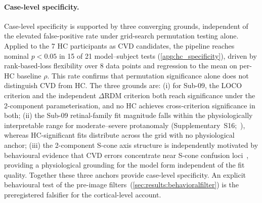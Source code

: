 \paragraph{Case-level specificity.}
Case-level specificity is supported by three converging grounds,
independent of the elevated false-positive rate under grid-search
permutation testing alone. Applied to the 7 HC participants as CVD
candidates, the pipeline reaches nominal $p < 0.05$ in 15 of 21
model--subject tests (\cref{app:hc_specificity}), driven by
rank-based-loss flexibility over 8 data points and regression to the
mean on per-HC baseline $\rho$. This rate confirms that permutation
significance alone does not distinguish CVD from HC. The three grounds
are: (i) for
Sub-09, the LOCO criterion and the independent $\Delta$RDM criterion both
reach significance under the 2-component parameterisation, and no HC
achieves cross-criterion significance in both; (ii) the Sub-09 retinal-family
fit magnitude falls within the physiologically interpretable range for
moderate--severe protanomaly (Supplementary~S16;~),
whereas HC-significant fits distribute across the grid with no physiological
anchor; (iii) the 2-component S-cone axis structure is independently
motivated by behavioural evidence that CVD errors concentrate near S-cone
confusion loci~\cite{emery2021}, providing a physiological grounding for the
model form independent of the fit quality. Together these three anchors
provide case-level specificity. An explicit behavioural test of the
pre-image filters~(\cref{sec:results:behavioralfilter}) is the preregistered
falsifier for the cortical-level account.


